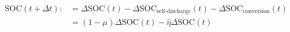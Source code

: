 \begin{equation}
	\begin{split}
		\text{SOC}(t+\Delta t) :&= \Delta\text{SOC}(t) - \Delta\text{SOC}_\text{self-discharge}(t) - \Delta\text{SOC}_\text{conversion}(t)\\
		&= (1-\mu)\Delta\text{SOC}(t) - \hat{\eta}\Delta\text{SOC}(t)	
	\end{split}
	\label{ch4:equ:soc-transition}
\end{equation}
